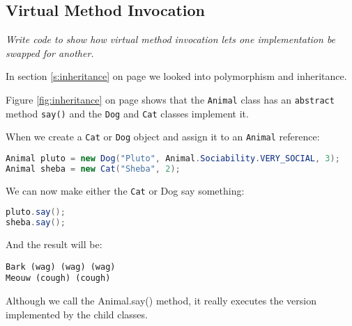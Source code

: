 \subsection{Virtual Method Invocation}
\textit{Write code to show how virtual method invocation lets one implementation be swapped for another.}

In section \ref{s:inheritance} on page \pageref{s:inheritance} we looked into polymorphism and inheritance.

Figure \ref{fig:inheritance} on page \pageref{fig:inheritance} shows that the \texttt{Animal} class has an \texttt{abstract} method \texttt{say()} and the \texttt{Dog} and \texttt{Cat} classes implement it.

When we create a \texttt{Cat} or \texttt{Dog} object and assign it to an \texttt{Animal} reference:
\begin{lstlisting}[language=Java]
Animal pluto = new Dog("Pluto", Animal.Sociability.VERY_SOCIAL, 3);
Animal sheba = new Cat("Sheba", 2);
\end{lstlisting}

We can now make either the \texttt{Cat} or Dog say something:
\begin{lstlisting}[language=Java]
pluto.say();
sheba.say();
\end{lstlisting}
And the result will be:
\begin{lstlisting}
Bark (wag) (wag) (wag)
Meouw (cough) (cough)
\end{lstlisting}

Although we call the Animal.say() method, it really executes the version implemented by the child classes. 